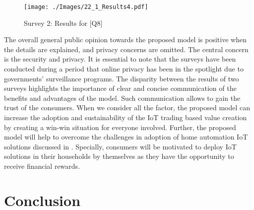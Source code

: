 \documentclass[conference]{IEEEtran}
\begin{document}
\begin{figure}[t]
 \centering
\texttt{[image: ./Images/22\_1\_Results4.pdf]}
\vspace{-0.23cm}	
 \caption{Survey 2: Results for [Q8]}
 \label{Figure:SurveyMonkey_Surveys_Results4}	
\vspace{-0.72cm}	
\end{figure}







The overall general public opinion towards the proposed model is positive when the details are explained, and privacy concerns are omitted. The central concern is the security and privacy. It is essential to note that the surveys have been conducted during a period that online privacy has been in the spotlight due to governments' surveillance programs. The disparity between the results of two surveys highlights the importance of clear and concise communication of the benefits and advantages of the model. Such communication allows to gain the trust of the consumers. When we consider all the factor, the proposed model can increase the adoption and sustainability of the IoT trading based value creation by creating a win-win situation for everyone involved. Further, the proposed model will help to overcome the challenges in adoption of home automation IoT solutions discussed in \cite{Z001}. Specially, consumers will be motivated to deploy IoT solutions  in their households by themselves as they have the opportunity to receive financial rewards. 













\section{Conclusion}
\label{sec:Conclusion}
\end{document}
